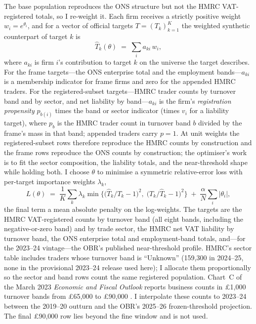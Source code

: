 The base population reproduces the ONS structure but not
the HMRC VAT-registered totals, so I re-weight it. Each firm receives a strictly
positive weight $w_i = e^{\theta_i}$, and for a vector of official targets
$T=(T_k)_{k=1}^{K}$ the weighted synthetic counterpart of target $k$ is
\[
  \widehat{T}_k(\theta) \;=\; \sum_i a_{ki}\, w_i ,
\]
where $a_{ki}$ is firm $i$'s contribution to target $k$ on the universe the
target describes. For the frame targets---the ONS enterprise total and the
employment bands---$a_{ki}$ is a membership indicator for frame firms and zero
for the appended HMRC traders. For the registered-subset targets---HMRC trader
counts by turnover band and by sector, and net liability by band---$a_{ki}$ is
the firm's \emph{registration propensity} $p_{b(i)}$ times the band or sector
indicator (times $v_i$ for a liability target), where $p_b$ is the HMRC trader
count in turnover band $b$ divided by the frame's mass in that band; appended
traders carry $p=1$. At unit weights the registered-subset rows therefore
reproduce the HMRC counts by construction and the frame rows reproduce the ONS
counts by construction; the optimiser's work is to fit the sector composition,
the liability totals, and the near-threshold shape while holding both. I choose
$\theta$ to minimise a symmetric relative-error
loss with per-target importance weights $\lambda_k$,
\[
  L(\theta) \;=\; \frac{1}{K}\sum_{k} \lambda_k
    \min\!\Big\{ \big(\widehat{T}_k/T_k - 1\big)^2,\; \big(T_k/\widehat{T}_k - 1\big)^2 \Big\}
    \;+\; \frac{\alpha}{N}\sum_i \lvert \theta_i \rvert ,
\]
the final term a mean absolute penalty on the log-weights. The targets are the
HMRC VAT-registered counts by turnover band (all eight bands, including the
negative-or-zero band) and by trade sector, the HMRC net VAT liability by
turnover band, the ONS enterprise total and employment-band totals, and---for
the 2023--24 vintage---the OBR's published near-threshold profile. HMRC's
sector table includes traders whose turnover band is ``Unknown''
(159{,}300 in 2024--25, none in the provisional 2023--24 release used here); I allocate them proportionally so
the sector and band rows count the same registered population. Chart~C of the
March 2023 \emph{Economic and Fiscal Outlook} reports business counts in
\pounds1{,}000 turnover bands from \pounds65{,}000 to \pounds90{,}000
\citep{obr2023vat}. I interpolate these counts to 2023--24 between the
2019--20 outturn and the OBR's 2025--26 frozen-threshold projection. The final
\pounds90{,}000 row lies beyond the fine window and is not used.

